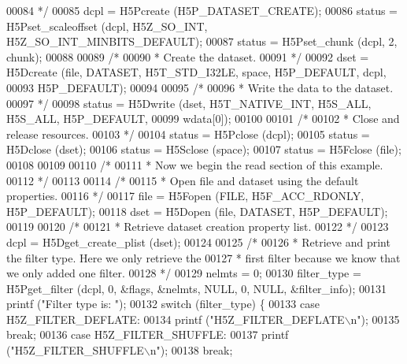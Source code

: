 \begin{DoxyCode}
00084 \textcolor{comment}{     */}
00085     dcpl = H5Pcreate (H5P\_DATASET\_CREATE);
00086     status = H5Pset\_scaleoffset (dcpl, H5Z\_SO\_INT, H5Z\_SO\_INT\_MINBITS\_DEFAULT);
00087     status = H5Pset\_chunk (dcpl, 2, chunk);
00088 
00089     \textcolor{comment}{/*}
00090 \textcolor{comment}{     * Create the dataset.}
00091 \textcolor{comment}{     */}
00092     dset = H5Dcreate (file, DATASET, H5T\_STD\_I32LE, space, H5P\_DEFAULT, dcpl,
00093                 H5P\_DEFAULT);
00094 
00095     \textcolor{comment}{/*}
00096 \textcolor{comment}{     * Write the data to the dataset.}
00097 \textcolor{comment}{     */}
00098     status = H5Dwrite (dset, H5T\_NATIVE\_INT, H5S\_ALL, H5S\_ALL, H5P\_DEFAULT,
00099                 wdata[0]);
00100 
00101     \textcolor{comment}{/*}
00102 \textcolor{comment}{     * Close and release resources.}
00103 \textcolor{comment}{     */}
00104     status = H5Pclose (dcpl);
00105     status = H5Dclose (dset);
00106     status = H5Sclose (space);
00107     status = H5Fclose (file);
00108 
00109 
00110     \textcolor{comment}{/*}
00111 \textcolor{comment}{     * Now we begin the read section of this example.}
00112 \textcolor{comment}{     */}
00113 
00114     \textcolor{comment}{/*}
00115 \textcolor{comment}{     * Open file and dataset using the default properties.}
00116 \textcolor{comment}{     */}
00117     file = H5Fopen (FILE, H5F\_ACC\_RDONLY, H5P\_DEFAULT);
00118     dset = H5Dopen (file, DATASET, H5P\_DEFAULT);
00119 
00120     \textcolor{comment}{/*}
00121 \textcolor{comment}{     * Retrieve dataset creation property list.}
00122 \textcolor{comment}{     */}
00123     dcpl = H5Dget\_create\_plist (dset);
00124 
00125     \textcolor{comment}{/*}
00126 \textcolor{comment}{     * Retrieve and print the filter type.  Here we only retrieve the}
00127 \textcolor{comment}{     * first filter because we know that we only added one filter.}
00128 \textcolor{comment}{     */}
00129     nelmts = 0;
00130     filter\_type = H5Pget\_filter (dcpl, 0, &flags, &nelmts, NULL, 0, NULL, &filter\_info);
00131     printf (\textcolor{stringliteral}{"Filter type is: "});
00132     \textcolor{keywordflow}{switch} (filter\_type) \{
00133         \textcolor{keywordflow}{case} H5Z\_FILTER\_DEFLATE:
00134             printf (\textcolor{stringliteral}{"H5Z\_FILTER\_DEFLATE\(\backslash\)n"});
00135             \textcolor{keywordflow}{break};
00136         \textcolor{keywordflow}{case} H5Z\_FILTER\_SHUFFLE:
00137             printf (\textcolor{stringliteral}{"H5Z\_FILTER\_SHUFFLE\(\backslash\)n"});
00138             \textcolor{keywordflow}{break};

\end{DoxyCode}

